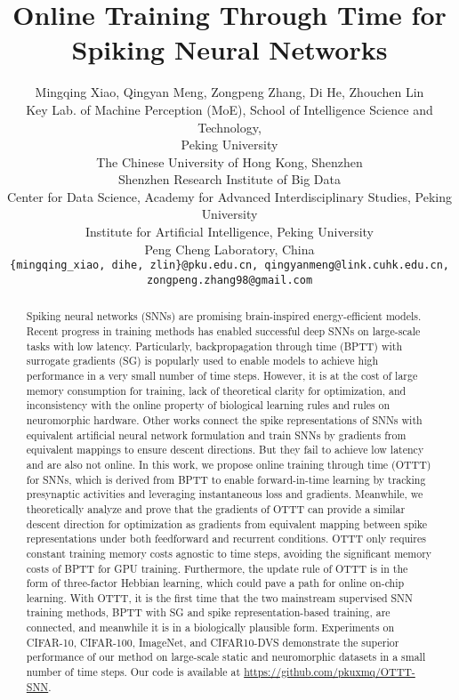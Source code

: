 \documentclass{article}
\title{Online Training Through Time for Spiking Neural Networks}
\author{Mingqing Xiao, Qingyan Meng, Zongpeng Zhang, Di He, Zhouchen Lin \\
  Key Lab. of Machine Perception (MoE), School of Intelligence Science and Technology, \\Peking University\\
  The Chinese University of Hong Kong, Shenzhen\\
  Shenzhen Research Institute of Big Data\\
  Center for Data Science, Academy for Advanced Interdisciplinary Studies, Peking University\\
  Institute for Artificial Intelligence, Peking University\\
  Peng Cheng Laboratory, China\\
  \texttt{\{mingqing\_xiao, dihe, zlin\}@pku.edu.cn, qingyanmeng@link.cuhk.edu.cn,}\\ \texttt{zongpeng.zhang98@gmail.com} \\
}
\begin{document}
\maketitle

\begin{abstract}
  Spiking neural networks (SNNs) are promising brain-inspired energy-efficient models. Recent progress in training methods has enabled successful deep SNNs on large-scale tasks with low latency. Particularly, backpropagation through time (BPTT) with surrogate gradients (SG) is popularly used to enable models to achieve high performance in a very small number of time steps. However, it is at the cost of large memory consumption for training, lack of theoretical clarity for optimization, and inconsistency with the online property of biological learning rules and rules on neuromorphic hardware. Other works connect the spike representations of SNNs with equivalent artificial neural network formulation and train SNNs by gradients from equivalent mappings to ensure descent directions. But they fail to achieve low latency and are also not online. In this work, we propose online training through time (OTTT) for SNNs, which is derived from BPTT to enable forward-in-time learning by tracking presynaptic activities and leveraging instantaneous loss and gradients. Meanwhile, we theoretically analyze and prove that the gradients of OTTT can provide a similar descent direction for optimization as gradients from equivalent mapping between spike representations under both feedforward and recurrent conditions. OTTT only requires constant training memory costs agnostic to time steps, avoiding the significant memory costs of BPTT for GPU training. Furthermore, the update rule of OTTT is in the form of three-factor Hebbian learning, which could pave a path for online on-chip learning. With OTTT, it is the first time that the two mainstream supervised SNN training methods, BPTT with SG and spike representation-based training, are connected, and meanwhile it is in a biologically plausible form. Experiments on CIFAR-10, CIFAR-100, ImageNet, and CIFAR10-DVS demonstrate the superior performance of our method on large-scale static and neuromorphic datasets in a small number of time steps. Our code is available at \url{https://github.com/pkuxmq/OTTT-SNN}.
\end{abstract}

\vspace{-3mm}
\end{document}
